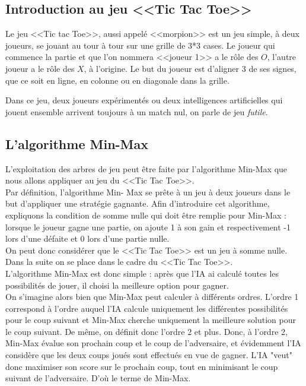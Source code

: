 \documentclass{article}
\begin{document}
\subsection{Introduction au jeu <<Tic Tac Toe>>}

Le jeu <<Tic tac Toe>>, aussi appelé <<morpion>> est un jeu simple, à deux joueurs, se jouant au tour à tour sur une grille de 3*3 cases.
Le joueur qui commence la partie et que l'on nommera <<joueur 1>> a le rôle des $O$, l'autre joueur a le rôle des $X$, à l'origine.
Le but du joueur est d'aligner 3 de ses signes, que ce soit en ligne, en colonne ou en diagonale dans la grille.

Dans ce jeu, deux joueurs expérimentés ou deux intelligences artificielles qui jouent ensemble arrivent toujours à un match
nul, on parle de jeu \emph{futile}.


\subsection{L'algorithme Min-Max}

L'exploitation des arbres de jeu peut être faite par l'algorithme Min-Max
que nous allons appliquer au jeu du <<Tic Tac Toe>>. \\

Par définition, l'algorithme Min-
Max se prête à un jeu à deux joueurs dans le but d'appliquer une stratégie
gagnante.
Afin d'introduire cet algorithme, expliquons la condition de somme nulle qui
doit être remplie pour Min-Max :
lorsque le joueur gagne une partie, on ajoute 1 à son gain et respectivement -1
lors
d'une défaite et 0 lors d'une partie nulle. \\

On peut donc considérer que le <<Tic Tac Toe>> est un jeu à somme nulle.
Dans la suite on se place dans le cadre du <<Tic Tac Toe>>. \\

L'algorithme Min-Max est donc simple : après que l'IA ai calculé toutes les
possibilités de jouer,
 il choisi la meilleure option pour gagner. \\

On s'imagine alors bien que Min-Max peut calculer à différents ordres. L'ordre 1
correspond à l'ordre auquel
l'IA calcule uniquement les différentes possibilités pour le coup suivant et
Min-Max cherche uniquement
la meilleure solution pour le coup suivant. De même, on définit donc l'ordre 2
et plus.
Donc, à l'ordre 2, Min-Max évalue son prochain coup et le coup de l'adversaire,
et évidemment
l'IA considère que les deux coups joués sont effectués en vue de gagner. L'IA
"veut" donc
maximiser son score sur le prochain coup, tout en minimisant le coup suivant de
l'adversaire.
D'où le terme de Min-Max. 
\end{document}
